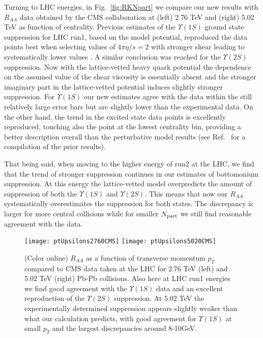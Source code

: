 Turning to LHC energies, in Fig.~\ref{fig:RKNpart} we compare our new results with $R_{AA}$ data obtained by the CMS collaboration at (left) 2.76 TeV and (right) 5.02 TeV as function of centrality. Previous estimates of the $\Upsilon(1S)$ ground state suppression for LHC run1, based on the model potential, reproduced the data points best when selecting values of $4\pi\eta/s=2$ with stronger shear leading to systematically lower values \cite{Krouppa:2015yoa}. A similar conclusion was reached for the $\Upsilon(2S)$ suppression. Now with the lattice-vetted heavy quark potential the dependence on the assumed value of the shear viscosity is essentially absent and the stronger imaginary part in the lattice-vetted potential induces slightly stronger suppression. For $\Upsilon(1S)$ our new estimates agree with the data within the still relatively large error bars but are slightly lower than the experimental data. On the other hand, the trend in the excited state data points is excellently reproduced, touching also the point at the lowest centrality bin, providing a better description overall than the perturbative model results (see Ref.~\cite{Krouppa:2017lsw} for a compilation of the prior results).

That being said, when moving to the higher energy of run2 at the LHC, we find that the trend of stronger suppression continues in our estimates of bottomonium suppression. At this energy the lattice-vetted model overpredicts the amount of suppression of both the $\Upsilon(1S)$ and $\Upsilon(2S)$. This means that now our $R_{AA}$ systematically overestimates the suppression for both states. The discrepancy is larger for more central collisions while for smaller $N_{\rm part}$ we still find reasonable agreement with the data.

\begin{figure*}[h]
\centerline{
\texttt{[image: ptUpsilons2760CMS]}
\texttt{[image: ptUpsilons5020CMS]}
}
\caption{
(Color online) $R_{AA}$ as a function of transverse momentum $p_{T}$ compared to CMS data taken at the LHC for 2.76 TeV (left) and 5.02 TeV (right) Pb-Pb collisions. Also here at LHC run1 energies we find good agreement with the $\Upsilon(1S)$ data and an excellent reproduction of the $\Upsilon(2S)$ suppression. At 5.02 TeV the experimentally determined suppression appears slightly weaker than what our calculation predicts, with good agreement for $\Upsilon(1S)$ at small $p_T$ and the largest discrepancies around 8-10GeV.}
\label{fig:RKpT}
\end{figure*}

